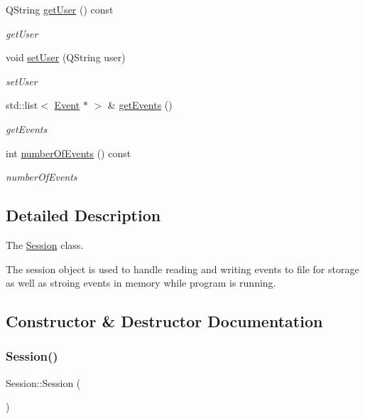 \begin{DoxyCompactItemize}
Q\+String \hyperlink{class_session_a09e51bffb8d4657efcb8ccf47be3192d}{get\+User} () const
\begin{DoxyCompactList}\small\item\em get\+User \end{DoxyCompactList}\item 
void \hyperlink{class_session_a3e4500bdcf80458ae14dde3eb413adb8}{set\+User} (Q\+String user)
\begin{DoxyCompactList}\small\item\em set\+User \end{DoxyCompactList}\item 
std\+::list$<$ \hyperlink{class_event}{Event} $\ast$ $>$ \& \hyperlink{class_session_a9712e356f0d5c3efdaed996ddc063738}{get\+Events} ()
\begin{DoxyCompactList}\small\item\em get\+Events \end{DoxyCompactList}\item 
int \hyperlink{class_session_aa6766de9b237384f6eff9ccbdfd8bde9}{number\+Of\+Events} () const
\begin{DoxyCompactList}\small\item\em number\+Of\+Events \end{DoxyCompactList}\end{DoxyCompactItemize}


\subsection{Detailed Description}
The \hyperlink{class_session}{Session} class. 

The session object is used to handle reading and writing events to file for storage as well as stroing events in memory while program is running. 

\subsection{Constructor \& Destructor Documentation}
\mbox{\label{class_session_ad92ef09b872c9227e38a6efdd4d8a837}} 
\subsubsection{\texorpdfstring{Session()}{Session()}\hspace{0.1cm}{\footnotesize\ttfamily [1/2]}}
{\footnotesize\ttfamily Session\+::\+Session (\begin{DoxyParamCaption}{ }\end{DoxyParamCaption})}



